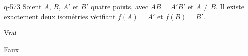 \begin{truefalse}{q-573}
Soient $A$, $B$, $A'$ et $B'$  quatre points, avec $AB=A'B'$ et $A\neq B$. Il existe exactement deux isométries vérifiant $f(A)=A'$ et $f(B)=B'$.
\item* Vrai
\item Faux
\end{truefalse}

